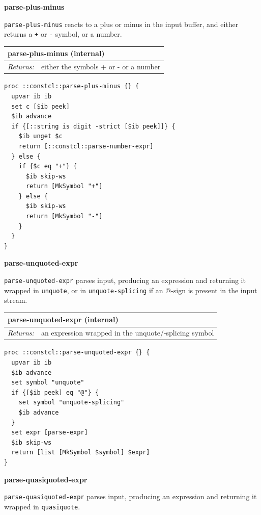 \documentclass[twoside,9pt]{report}
\begin{document}
\textbf{parse-plus-minus}


\texttt{parse-plus-minus} reacts to a plus or minus in the input buffer, and either returns a \texttt{+} or \texttt{-} symbol, or a number.

\begin{tabular}{ |l l| }
\hline
\multicolumn{2}{|l|}{parse-plus-minus (internal)} \\
\hline
\textit{Returns:} & either the symbols + or - or a number \\
\hline
\end{tabular}

\noindent\makebox[\linewidth]{\rule{\linewidth}{0.4pt}}
\begin{lstlisting}
proc ::constcl::parse-plus-minus {} {
  upvar ib ib
  set c [$ib peek]
  $ib advance
  if {[::string is digit -strict [$ib peek]]} {
    $ib unget $c
    return [::constcl::parse-number-expr]
  } else {
    if {$c eq "+"} {
      $ib skip-ws
      return [MkSymbol "+"]
    } else {
      $ib skip-ws
      return [MkSymbol "-"]
    }
  }
}
\end{lstlisting}
\noindent\makebox[\linewidth]{\rule{\linewidth}{0.4pt}}

\textbf{parse-unquoted-expr}


\texttt{parse-unquoted-expr} parses input, producing an expression and returning it wrapped in \texttt{unquote}, or in \texttt{unquote-splicing} if an @-sign is present in the input stream.

\begin{tabular}{ |l l| }
\hline
\multicolumn{2}{|l|}{parse-unquoted-expr (internal)} \\
\hline
\textit{Returns:} & an expression wrapped in the unquote/-splicing symbol \\
\hline
\end{tabular}

\noindent\makebox[\linewidth]{\rule{\linewidth}{0.4pt}}
\begin{lstlisting}
proc ::constcl::parse-unquoted-expr {} {
  upvar ib ib
  $ib advance
  set symbol "unquote"
  if {[$ib peek] eq "@"} {
    set symbol "unquote-splicing"
    $ib advance
  }
  set expr [parse-expr]
  $ib skip-ws
  return [list [MkSymbol $symbol] $expr]
}
\end{lstlisting}
\noindent\makebox[\linewidth]{\rule{\linewidth}{0.4pt}}

\textbf{parse-quasiquoted-expr}


\texttt{parse-quasiquoted-expr} parses input, producing an expression and returning it wrapped in \texttt{quasiquote}.
\end{document}
